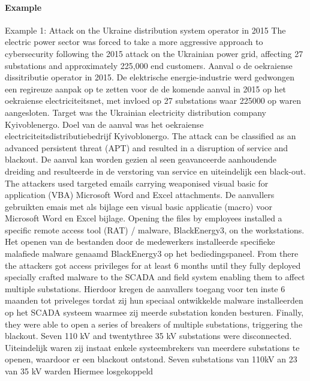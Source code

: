 \paragraph{Example}
Example 1: Attack on the Ukraine distribution system operator in 2015 The electric power sector was
forced to take a more aggressive approach to cybersecurity following the 2015 attack on the
Ukrainian power grid, affecting 27 substations and approximately 225,000 end customers. Aanval o
de oekraiense dissitributie operator in 2015. De elektrische energie-industrie werd gedwongen een
regireuze aanpak op te zetten voor de de komende aanval in 2015 op het oekraiense electriciteitsnet,
met invloed op 27 substations waar 225000 op waren aangesloten.
Target was the Ukrainian electricity distribution company Kyivoblenergo. Doel van de aanval was het
oekraiense electriciteitsdistributiebedrijf Kyivoblonergo.
The attack can be classified as an advanced persistent threat (APT) and resulted in a disruption of
service and blackout. De aanval kan worden gezien al seen geavanceerde aanhoudende dreiding and
resulteerde in de verstoring van service en uiteindelijk een black-out.
The attackers used targeted emails carrying weaponised visual basic for application (VBA) Microsoft
Word and Excel attachments. De aanvallers gebruikten emais met als bijlage een visual basic
applicatie (macro) voor Microsoft Word en Excel bijlage.
Opening the files by employees installed a specific remote access tool (RAT) / malware,
BlackEnergy3, on the workstations. Het openen van de bestanden door de medewerkers installeerde
specifieke malafiede malware genaamd BlackEnergy3 op het bediedingspaneel.
From there the attackers got access privileges for at least 6 months until they fully deployed specially
crafted malware to the SCADA and field system enabling them to affect multiple substations.
Hierdoor kregen de aanvallers toegang voor ten inste 6 maanden tot priveleges tordat zij hun
speciaal ontwikkelde malware installeerden op het SCADA systeem waarmee zij meerde substation
konden besturen.
Finally, they were able to open a series of breakers of multiple substations, triggering the blackout.
Seven 110 kV and twentythree 35 kV substations were disconnected. Uiteindelijk waren zij instaat
enkele systeembrekers van meerdere substations te openen, waardoor er een blackout ontstond.
Seven substations van 110kV an 23 van 35 kV warden Hiermee losgekoppeld

